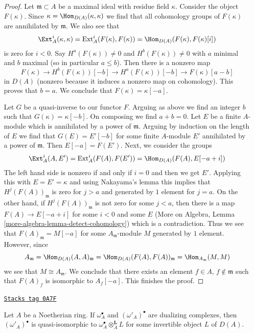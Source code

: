 \begin{proof}
Let $\mathfrak m \subset A$ be a maximal ideal with residue field $\kappa$.
Consider the object $F(\kappa)$. Since
$\kappa = \Hom_{D(A)}(\kappa, \kappa)$ we find that all
cohomology groups of $F(\kappa)$ are annihilated by $\mathfrak m$.
We also see that
$$
\Ext^i_A(\kappa, \kappa) = \text{Ext}^i_A(F(\kappa), F(\kappa))
= \Hom_{D(A)}(F(\kappa), F(\kappa)[i])
$$
is zero for $i < 0$. Say $H^a(F(\kappa)) \not = 0$ and
$H^b(F(\kappa)) \not = 0$ with $a$ minimal and $b$ maximal
(so in particular $a \leq b$). Then there is a nonzero map
$$
F(\kappa) \to H^b(F(\kappa))[-b] \to H^a(F(\kappa))[-b]
\to F(\kappa)[a - b]
$$
in $D(A)$ (nonzero because it induces a nonzero map on cohomology).
This proves that $b = a$. We conclude that $F(\kappa) = \kappa[-a]$.

\medskip\noindent
Let $G$ be a quasi-inverse to our functor $F$. Arguing as above
we find an integer $b$ such that $G(\kappa) = \kappa[-b]$.
On composing we find $a + b = 0$. Let $E$ be a finite $A$-module
which is annihilated by a power of $\mathfrak m$. Arguing by
induction on the length of $E$ we find that $G(E) = E'[-b]$
for some finite $A$-module $E'$ annihilated by a power of
$\mathfrak m$. Then $E[-a] = F(E')$.
Next, we consider the groups
$$
\Ext^i_A(A, E') = \text{Ext}^i_A(F(A), F(E')) =
\Hom_{D(A)}(F(A), E[-a + i])
$$
The left hand side is nonzero if and only if $i = 0$ and then
we get $E'$. Applying this with $E = E' = \kappa$ and using Nakayama's
lemma this implies that $H^j(F(A))_\mathfrak m$ is zero for $j > a$ and
generated by $1$ element for $j = a$. On the other hand, if
$H^j(F(A))_\mathfrak m$ is not zero for some $j < a$, then
there is a map $F(A) \to E[-a + i]$ for some $i < 0$ and some
$E$ (More on Algebra, Lemma \ref{more-algebra-lemma-detect-cohomology})
which is a contradiction.
Thus we see that $F(A)_\mathfrak m = M[-a]$
for some $A_\mathfrak m$-module $M$ generated by $1$ element.
However, since
$$
A_\mathfrak m = \Hom_{D(A)}(A, A)_\mathfrak m =
\Hom_{D(A)}(F(A), F(A))_\mathfrak m = \Hom_{A_\mathfrak m}(M, M)
$$
we see that $M \cong A_\mathfrak m$. We conclude that there exists
an element $f \in A$, $f \not \in \mathfrak m$ such that
$F(A)_f$ is isomorphic to $A_f[-a]$. This finishes the proof.
\end{proof}

\begin{lemma}
\label{dualizing-lemma-dualizing-unique}
\href{https://stacks.math.columbia.edu/tag/0A7F}{\texttt{Stacks tag 0A7F}}

Let $A$ be a Noetherian ring. If $\omega_A^\bullet$ and
$(\omega'_A)^\bullet$ are dualizing complexes, then
$(\omega'_A)^\bullet$ is quasi-isomorphic to
$\omega_A^\bullet \otimes_A^\mathbf{L} L$
for some invertible object $L$ of $D(A)$.
\end{lemma}

